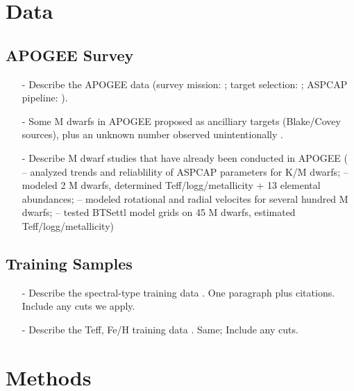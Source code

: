 \documentclass[modern]{aastex62}
\begin{document}
\section{Data} \label{sec:data}

\subsection{APOGEE Survey}
\begin{enumerate}
\item[-] Describe the APOGEE data (survey mission: \citealt{Majewski:2015}; target selection: \citealt{Zasowski:2013}; ASPCAP pipeline: \citealt{Perez:2016}). 

\item[-] Some M dwarfs in APOGEE proposed as ancilliary targets (Blake/Covey sources), plus an unknown number observed unintentionally \citep{Desphande:2013}.

\item[-] Describe M dwarf studies that have already been conducted in APOGEE (\citealt{Schmidt:2016} -- analyzed trends and reliablility of ASPCAP parameters for K/M dwarfs; \citealt{Souto:2017} -- modeled 2 M dwarfs, determined Teff/logg/metallicity + 13 elemental abundances; \citealt{Desphande:2013} -- modeled rotational and radial velocites for several hundred M dwarfs; \citealt{Rajpurohit:2018} -- tested BTSettl model grids on 45 M dwarfs, estimated Teff/logg/metallicity)
\end{enumerate}

\subsection{Training Samples}
\begin{enumerate}
\item[-] Describe the spectral-type training data \citep{West:2011}. One paragraph plus citations. Include any cuts we apply. \color{red}{Make diagnostic plots.}\color{black}

\item[-] Describe the Teff, Fe/H training data \citep{Mann:2015}. Same; Include any cuts. \color{red}{Make diagnostic plots.}\color{black}
\end{enumerate}


\section{Methods} \label{sec:cannon}
\end{document}
